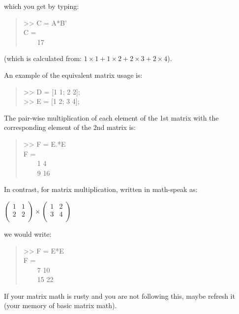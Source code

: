 \documentclass{tufte-book} %
\newenvironment{docspec}{\begin{quotation}\ttfamily\parskip0pt\parindent0pt\ignorespaces}{\end{quotation}}
\begin{document}
\noindent which you get by typing:

\begin{docspec}
>> C = A*B'
\\
C =\\
\ \ \ \ 17
\end{docspec}
(which is  calculated from: \(1\times1 + 1\times2 + 2\times3 + 2\times4\)).

An example of the equivalent matrix usage is:

\begin{docspec}
>> D = [1 1; 2 2];\\
>> E = [1 2; 3 4];
\end{docspec}

The pair-wise multiplication of each element of the 1st matrix with the corresponding element of the 2nd matrix is:
\begin{docspec}
>> F = E.*E
\\
F =\\
\ \ \ \ 1     4\\
\ \ \ \ 9    16
\end{docspec}

In contrast, for matrix multiplication, written in math-speak as:

\vspace{2mm}
\(\begin{pmatrix}1 & 1 \\
2 & 2 \\
\end{pmatrix}\times\begin{pmatrix}1 & 2 \\
3 & 4 \\
\end{pmatrix}\)
\vspace{2mm}

we would write:

\begin{docspec}
>> F = E*E
\\
F =\\
\ \ \ \  7    10\\
\ \ \ \ 15    22
\end{docspec}

If your matrix math is rusty and you are not following this, maybe refresh it (your memory of basic matrix math).


\newpage

\end{document}
